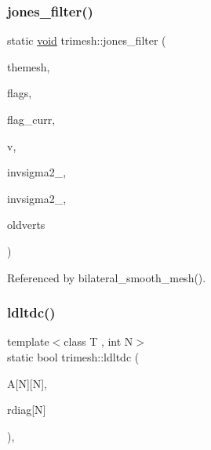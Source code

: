 \mbox{\label{namespacetrimesh_ae8e9e11f392a4b0bf07246c5c206275c}} 
\subsubsection{\texorpdfstring{jones\+\_\+filter()}{jones\_filter()}}
{\footnotesize\ttfamily static \hyperlink{namespacetrimesh_a784ddfd979e1c579bda795a8edfc3f43}{void} trimesh\+::jones\+\_\+filter (\begin{DoxyParamCaption}\item[{\hyperlink{classtrimesh_1_1TriMesh}{Tri\+Mesh} $\ast$}]{themesh,  }\item[{vector$<$ unsigned $>$ \&}]{flags,  }\item[{unsigned \&}]{flag\+\_\+curr,  }\item[{int}]{v,  }\item[{float}]{invsigma2\+\_,  }\item[{float}]{invsigma2\+\_,  }\item[{vector$<$ \hyperlink{namespacetrimesh_a325b99fd6454b22fa4c4bc3223271b2c}{point} $>$ \&}]{oldverts }\end{DoxyParamCaption})\hspace{0.3cm}{\ttfamily [static]}}



Referenced by bilateral\+\_\+smooth\+\_\+mesh().

\mbox{\label{namespacetrimesh_a747a934d5c4e2649f6254d41791ea847}} 
\subsubsection{\texorpdfstring{ldltdc()}{ldltdc()}}
{\footnotesize\ttfamily template$<$class T , int N$>$ \\
static bool trimesh\+::ldltdc (\begin{DoxyParamCaption}\item[{T(\&)}]{A\mbox{[}\+N\mbox{]}\mbox{[}\+N\mbox{]},  }\item[{T}]{rdiag\mbox{[}\+N\mbox{]} }\end{DoxyParamCaption})\hspace{0.3cm}{\ttfamily [inline]}, {\ttfamily [static]}}

